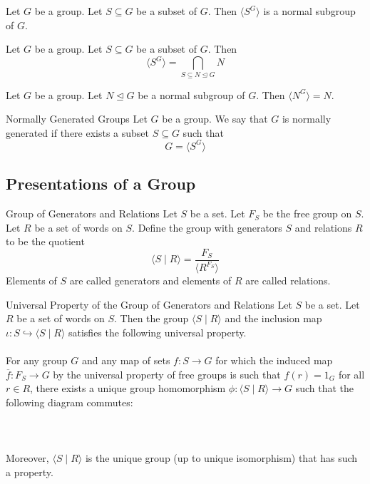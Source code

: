 \documentclass[a4paper]{article}
\begin{document}
\begin{lmm}{}{} Let $G$ be a group. Let $S\subseteq G$ be a subset of $G$. Then $\langle S^G\rangle$ is a normal subgroup of $G$. 
\end{lmm}

\begin{lmm}{}{} Let $G$ be a group. Let $S\subseteq G$ be a subset of $G$. Then $$\langle S^G\rangle=\bigcap_{S\subseteq N\trianglelefteq G}N$$
\end{lmm}

\begin{lmm}{}{} Let $G$ be a group. Let $N\trianglelefteq G$ be a normal subgroup of $G$. Then $\langle N^G\rangle=N$. 
\end{lmm}

\begin{defn}{Normally Generated Groups}{} Let $G$ be a group. We say that $G$ is normally generated if there exists a subset $S\subseteq G$ such that $$G=\langle S^G\rangle$$
\end{defn}

\subsection{Presentations of a Group}
\begin{defn}{Group of Generators and Relations}{} Let $S$ be a set. Let $F_S$ be the free group on $S$. Let $R$ be a set of words on $S$. Define the group with generators $S$ and relations $R$ to be the quotient $$\langle S\;|\;R\rangle=\frac{F_S}{\langle R^{F_S}\rangle}$$ Elements of $S$ are called generators and elements of $R$ are called relations. 
\end{defn}

\begin{prp}{Universal Property of the Group of Generators and Relations}{} Let $S$ be a set. Let $R$ be a set of words on $S$. Then the group $\langle S\;|\;R\rangle$ and the inclusion map $\iota:S\hookrightarrow\langle S\;|\;R\rangle$ satisfies the following universal property. \\~\\

For any group $G$ and any map of sets $f:S\to G$ for which the induced map $\overline{f}:F_S\to G$ by the universal property of free groups is such that $f(r)=1_G$ for all $r\in R$, there exists a unique group homomorphism $\phi:\langle S\;|\;R\rangle\to G$ such that the following diagram commutes: \\~\\
 \\~\\
Moreover, $\langle S\;|\;R\rangle$ is the unique group (up to unique isomorphism) that has such a property. 
\end{prp}
\end{document}
